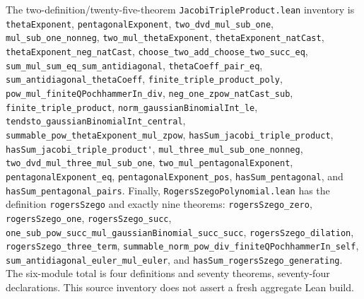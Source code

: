 \documentclass[11pt,oneside]{article}
\theoremstyle{definition}
\theoremstyle{remark}
\begin{document}
The two-definition/twenty-five-theorem
\nolinkurl{JacobiTripleProduct.lean} inventory is
\nolinkurl{thetaExponent}, \nolinkurl{pentagonalExponent},
\nolinkurl{two_dvd_mul_sub_one}, \nolinkurl{mul_sub_one_nonneg},
\nolinkurl{two_mul_thetaExponent}, \nolinkurl{thetaExponent_natCast},
\nolinkurl{thetaExponent_neg_natCast},
\nolinkurl{choose_two_add_choose_two_succ_eq},
\nolinkurl{sum_mul_sum_eq_sum_antidiagonal},
\nolinkurl{thetaCoeff_pair_eq}, \nolinkurl{sum_antidiagonal_thetaCoeff},
\nolinkurl{finite_triple_product_poly},
\nolinkurl{pow_mul_finiteQPochhammerIn_div},
\nolinkurl{neg_one_zpow_natCast_sub}, \nolinkurl{finite_triple_product},
\nolinkurl{norm_gaussianBinomialInt_le},
\nolinkurl{tendsto_gaussianBinomialInt_central},
\nolinkurl{summable_pow_thetaExponent_mul_zpow},
\nolinkurl{hasSum_jacobi_triple_product},
\nolinkurl{hasSum_jacobi_triple_product'},
\nolinkurl{mul_three_mul_sub_one_nonneg},
\nolinkurl{two_dvd_mul_three_mul_sub_one},
\nolinkurl{two_mul_pentagonalExponent},
\nolinkurl{pentagonalExponent_eq}, \nolinkurl{pentagonalExponent_pos},
\nolinkurl{hasSum_pentagonal}, and \nolinkurl{hasSum_pentagonal_pairs}.
Finally, \nolinkurl{RogersSzegoPolynomial.lean} has the definition
\nolinkurl{rogersSzego} and exactly nine theorems:
\nolinkurl{rogersSzego_zero}, \nolinkurl{rogersSzego_one},
\nolinkurl{rogersSzego_succ},
\nolinkurl{one_sub_pow_succ_mul_gaussianBinomial_succ_succ},
\nolinkurl{rogersSzego_dilation}, \nolinkurl{rogersSzego_three_term},
\nolinkurl{summable_norm_pow_div_finiteQPochhammerIn_self},
\nolinkurl{sum_antidiagonal_euler_mul_euler}, and
\nolinkurl{hasSum_rogersSzego_generating}.  The six-module total is four
definitions and seventy theorems, seventy-four declarations.
This source inventory does not assert a fresh aggregate Lean build.
\end{document}
